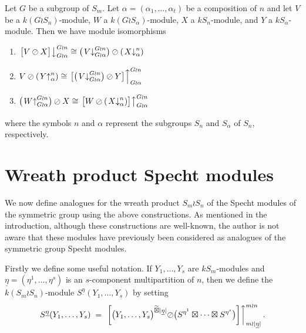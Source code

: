 \documentclass[ALCO,Unicode,published]{cedram}
\newcommand{\ul}[1]{\underline{#1}}
\begin{document}
\begin{prop}\label{wreath_ind_res:prop}\cite[Lemma 3.2]{CHTAN}
Let $G$ be a subgroup of $S_m$.
Let $\alpha = (\alpha_1,\ldots,\alpha_t)$ be a composition of $n$ and let $V$ be a $k(G{\wr}S_n)$-module, $W$ a
$k(G{\wr}S_\alpha)$-module, $X$ a $kS_n$-module, and $Y$ a $kS_\alpha$-module. Then we have module isomorphisms
\begin{enumerate}
\item $\left.\bigl[V \oslash X\bigr]\right\downarrow^{G{\wr}n}_{G{\wr}\alpha} \cong
\bigl(\left.V\right\downarrow^{G{\wr}n}_{G{\wr}\alpha}\bigr) \oslash \left(\left.X\right\downarrow^{n}_{\alpha}\right)$
\item $V \oslash \left(\left.Y\right\uparrow^{n}_{\alpha}\right)
\cong \left.\bigl[\bigl(\left.V\right\downarrow^{G{\wr}n}_{G{\wr}\alpha}\bigr) \oslash Y\bigr]\right\uparrow^{G{\wr}n}_{G{\wr}\alpha}$
\item $\bigl(\left.W\right\uparrow^{G{\wr}n}_{G{\wr}\alpha}\bigr) \oslash X
\cong \left.\bigl[W \oslash \left(\left.X\right\downarrow^{n}_{\alpha}\right)\bigr]\right\uparrow^{G{\wr}n}_{G{\wr}\alpha}$
\end{enumerate}
where the symbols $n$ and $\alpha$ represent the subgroups $S_n$ and $S_\alpha$ of $S_n$, respectively.
\end{prop}

\section{Wreath product Specht modules}
We now define analogues for the wreath product $S_m \wr S_n$ of the Specht modules of the symmetric group using the above constructions.
As mentioned in the introduction, although these constructions are well-known, the author is not aware that these modules have
previously been considered as analogues of the symmetric group Specht modules.

Firstly we define some useful notation. If $Y_1,\ldots,Y_s$ are $kS_m$-modules and $\ul{\eta} = (\eta^1,\ldots,\eta^s)$ is an
$s$-component multipartition of $n$, then we define the $k(S_m{\wr}S_n)$-module $S^{\ul{\eta}}(Y_1,\ldots,Y_s)$ by setting
\[
S^{\ul{\eta}}(Y_1,\ldots,Y_s)\;=\; \left.\left[\bigl(Y_1,\ldots,Y_s\bigr)^{\widetilde\boxtimes |\ul{\eta}|}{\oslash}
\bigl(S^{\eta^1}\boxtimes\cdots\boxtimes S^{\eta^s}\bigr)\right]\right\uparrow^{m{\wr}n}_{m{\wr}|\ul{\eta}|}.
\]
\end{document}
